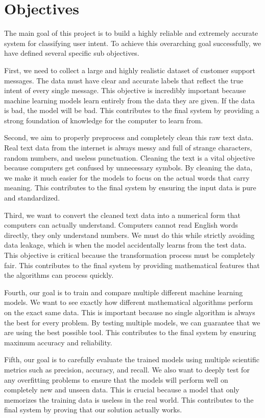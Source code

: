 \documentclass[12pt]{article}
\begin{document}
\section{Objectives}
The main goal of this project is to build a highly reliable and extremely accurate system for classifying user intent. To achieve this overarching goal successfully, we have defined several specific sub objectives. 

First, we need to collect a large and highly realistic dataset of customer support messages. The data must have clear and accurate labels that reflect the true intent of every single message. This objective is incredibly important because machine learning models learn entirely from the data they are given. If the data is bad, the model will be bad. This contributes to the final system by providing a strong foundation of knowledge for the computer to learn from.

Second, we aim to properly preprocess and completely clean this raw text data. Real text data from the internet is always messy and full of strange characters, random numbers, and useless punctuation. Cleaning the text is a vital objective because computers get confused by unnecessary symbols. By cleaning the data, we make it much easier for the models to focus on the actual words that carry meaning. This contributes to the final system by ensuring the input data is pure and standardized.

Third, we want to convert the cleaned text data into a numerical form that computers can actually understand. Computers cannot read English words directly, they only understand numbers. We must do this while strictly avoiding data leakage, which is when the model accidentally learns from the test data. This objective is critical because the transformation process must be completely fair. This contributes to the final system by providing mathematical features that the algorithms can process quickly.

Fourth, our goal is to train and compare multiple different machine learning models. We want to see exactly how different mathematical algorithms perform on the exact same data. This is important because no single algorithm is always the best for every problem. By testing multiple models, we can guarantee that we are using the best possible tool. This contributes to the final system by ensuring maximum accuracy and reliability.

Fifth, our goal is to carefully evaluate the trained models using multiple scientific metrics such as precision, accuracy, and recall. We also want to deeply test for any overfitting problems to ensure that the models will perform well on completely new and unseen data. This is crucial because a model that only memorizes the training data is useless in the real world. This contributes to the final system by proving that our solution actually works.
\end{document}
